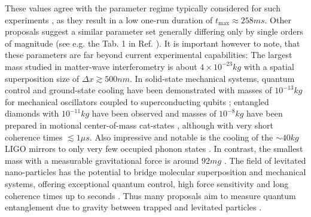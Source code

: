 These values agree with the parameter regime typically considered for such experiments \cite[Timestamp: 51:00]{Aspelmeyer_2024}, as they result in a low one-run duration of $t_\mathrm{max}\approx 258\si{ms}$.
Other proposals suggest a similar parameter set generally differing only by single orders of magnitude (see e.g. the Tab. 1 in Ref. \cite{Rijavec_2021}).
It is important however to note, that these parameters are far beyond current experimental capabilities:
The largest mass studied in matter-wave interferometry is about $4\times 10^{-23}\si{kg}$ \cite{Fein_2019} with a spatial superposition size of $\Delta x \gtrsim 500\si{nm}$.
In solid-state mechanical systems, quantum control and ground-state cooling have been demonstrated with masses of $10^{-13}\si{kg}$ for mechanical oscillators coupled to superconducting qubits \cite{OConnell_2010}; entangled diamonds with $10^{-11}\si{kg}$ have been observed \cite{Lee_2011} and masses of $10^{-8}\si{kg}$ have been prepared in motional center-of-mass cat-states \cite{Bild_2023}, although with very short coherence times $\lesssim 1\si{\mu s}$.
Also impressive and notable is the cooling of the $\sim 40\si{kg}$ LIGO mirrors to only very few occupied phonon states \cite{Whittle_2021}.
In contrast, the smallest mass with a measurable gravitational force is around $92 \si{mg}$ \cite{Westphal_2021}.
The field of levitated nano-particles has the potential to bridge molecular superposition and mechanical systems, offering exceptional quantum control, high force sensitivity and long coherence times up to seconds \cite{Aspelmeyer_2024}.
Thus many proposals aim to measure quantum entanglement due to gravity between trapped and levitated particles \cite{Krisnanda_2020,GonzalezBallestero_2021}.

